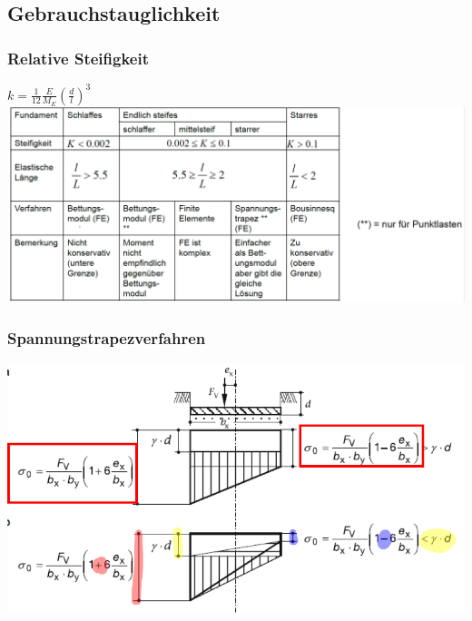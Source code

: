 	\begin{minipage}{0.5\linewidth}
		\subsection{Gebrauchstauglichkeit}
			\subsubsection{Relative Steifigkeit}
			$ k = \frac{1}{12} \frac{E}{M_E} \left( \frac{d}{l} \right)^3 $ \\
		\includegraphics[width=\linewidth]{images/Flachfun5starrschlaff.PNG}
	\end{minipage}
	\begin{minipage}{0.3\linewidth}
		\subsubsection{Spannungstrapezverfahren}
		\includegraphics[width=\linewidth]{images/Flachfun6Sptrapez.PNG}
	\end{minipage}



